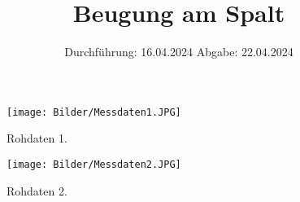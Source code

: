 

\subject{V406}
\title{Beugung am Spalt}
\date{%
  Durchführung: 16.04.2024
  \hspace{3em}
  Abgabe: 22.04.2024
}



\maketitle
\thispagestyle{empty}
\tableofcontents
\newpage






\printbibliography{}

\begin{figure}[H]
  \texttt{[image: Bilder/Messdaten1.JPG]}
  \caption{Rohdaten 1.}
\end{figure}

\begin{figure}[H]
  \texttt{[image: Bilder/Messdaten2.JPG]}
  \caption{Rohdaten 2.}
\end{figure}



